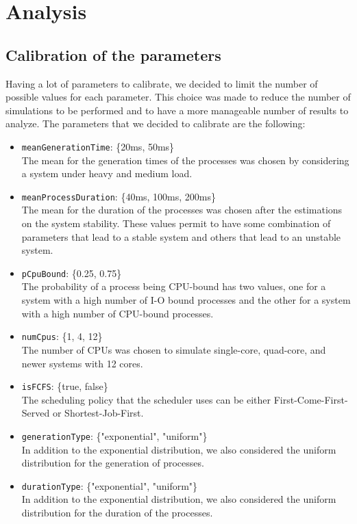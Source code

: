 \chapter{Analysis}

\section{Calibration of the parameters}

Having a lot of parameters to calibrate, we decided to limit the number of possible values for each parameter. This choice was made to reduce the number of simulations to be performed and to have a more manageable number of results to analyze. The parameters that we decided to calibrate are the following:

\begin{itemize}
    \item \texttt{meanGenerationTime}: \{20ms, 50ms\} \\
          The mean for the generation times of the processes was chosen by considering a system under heavy and medium load.
    \item \texttt{meanProcessDuration}: \{40ms, 100ms, 200ms\} \\
          The mean for the duration of the processes was chosen after the estimations on the system stability. These values permit to have some combination of parameters that lead to a stable system and others that lead to an unstable system.
    \item \texttt{pCpuBound}: \{0.25, 0.75\} \\
          The probability of a process being CPU-bound has two values, one for a system with a high number of I-O bound processes and the other for a system with a high number of CPU-bound processes.
    \item \texttt{numCpus}: \{1, 4, 12\} \\
          The number of CPUs was chosen to simulate single-core, quad-core, and newer systems with 12 cores.
    \item \texttt{isFCFS}: \{true, false\} \\
          The scheduling policy that the scheduler uses can be either First-Come-First-Served or Shortest-Job-First.
    \item \texttt{generationType}: \{"exponential", "uniform"\} \\
          In addition to the exponential distribution, we also considered the uniform distribution for the generation of processes.
    \item \texttt{durationType}: \{"exponential", "uniform"\} \\
          In addition to the exponential distribution, we also considered the uniform distribution for the duration of the processes.
\end{itemize}


